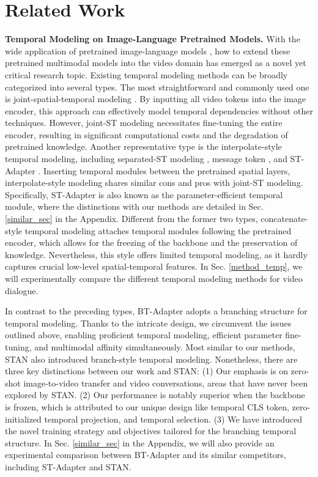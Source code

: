 \documentclass{article} \usepackage{iclr2024_conference,times}
\begin{document}
\section{Related Work}
\vspace{-0.5em}
\noindent \textbf{Temporal Modeling on Image-Language Pretrained Models.}
With the wide application of pretrained image-language models \citep{radford2021learning,yu2022coca}, how to extend these pretrained multimodal models into the video domain has emerged as a novel yet critical research topic. 
Existing temporal modeling methods can be broadly categorized into several types. 
The most straightforward and commonly used one is joint-spatial-temporal modeling \citep{bertasius2021space, wang2022internvideo, li2023unmasked, xue2022clip}. By inputting all video tokens into the image encoder, this approach can effectively model temporal dependencies without other techniques. However, joint-ST modeling necessitates fine-tuning the entire encoder, resulting in significant computational costs and the degradation of pretrained knowledge. 
Another representative type is the interpolate-style temporal modeling, including separated-ST modeling \citep{bertasius2021space, zeng2023tvtsv2}, message token \citep{ni2022expanding}, and ST-Adapter \citep{pan2022st}. Inserting temporal modules between the pretrained spatial layers, interpolate-style modeling shares similar cons and pros with joint-ST modeling. Specifically, ST-Adapter is also known as the parameter-efficient temporal module, where the distinctions with our methods are detailed in Sec. \ref{similar_sec} in the Appendix.
Different from the former two types, concatenate-style temporal modeling \citep{luo2022clip4clip, fang2021clip2video} attaches temporal modules following the pretrained encoder, which allows for the freezing of the backbone and the preservation of knowledge. Nevertheless, this style offers limited temporal modeling, as it hardly captures crucial low-level spatial-temporal features. In Sec. \ref{method_temp}, we will experimentally compare the different temporal modeling methods for video dialogue.



In contrast to the preceding types, BT-Adapter adopts a branching structure for temporal modeling. Thanks to the intricate design, we circumvent the issues outlined above, enabling proficient temporal modeling, efficient parameter fine-tuning, and multimodal affinity simultaneously.
Most similar to our methods, STAN \citep{liu2023revisiting} also introduced branch-style temporal modeling. Nonetheless, there are three key distinctions between our work and STAN: (1) Our emphasis is on zero-shot image-to-video transfer and video conversations, areas that have never been explored by STAN. (2) Our performance is notably superior when the backbone is frozen, which is attributed to our unique design like temporal CLS token, zero-initialized temporal projection, and temporal selection. (3) We have introduced the novel training strategy and objectives tailored for the branching temporal structure. In Sec. \ref{similar_sec} in the Appendix, we will also provide an experimental comparison between BT-Adapter and its similar competitors, including ST-Adapter and STAN.
\end{document}
